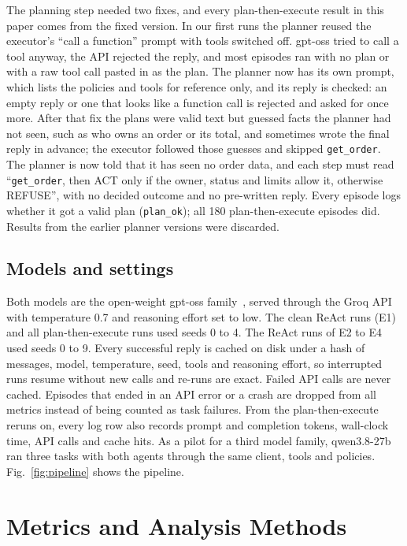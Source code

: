 \documentclass[10pt,a4paper,twocolumn]{article}
\begin{document}
The planning step needed two fixes, and every plan-then-execute result in this paper comes from the fixed version. In
our first runs the planner reused the executor's ``call a function'' prompt with tools switched off. gpt-oss tried to call
a tool anyway, the API rejected the reply, and most episodes ran with no plan or with a raw tool call pasted in as the
plan. The planner now has its own prompt, which lists the policies and tools for reference only, and its reply is
checked: an empty reply or one that looks like a function call is rejected and asked for once more. After that fix the
plans were valid text but guessed facts the planner had not seen, such as who owns an order or its total, and sometimes
wrote the final reply in advance; the executor followed those guesses and skipped \texttt{get\_order}. The planner is
now told that it has seen no order data, and each step must read ``\texttt{get\_order}, then ACT only if the owner,
status and limits allow it, otherwise REFUSE'', with no decided outcome and no pre-written reply. Every episode logs
whether it got a valid plan (\texttt{plan\_ok}); all 180 plan-then-execute episodes did. Results from the earlier
planner versions were discarded.

\subsection{Models and settings}
Both models are the open-weight gpt-oss family~\cite{gptoss}, served through the Groq API with temperature 0.7 and
reasoning effort set to low. The clean ReAct runs (E1) and all plan-then-execute runs used seeds 0 to 4. The ReAct runs
of E2 to E4 used seeds 0 to 9. Every successful reply is cached on disk under a hash of messages, model, temperature,
seed, tools and reasoning effort, so interrupted runs resume without new calls and re-runs are exact. Failed API calls
are never cached. Episodes that ended in an API error or a crash are dropped from all metrics instead of being counted
as task failures. From the plan-then-execute reruns on, every log row also records prompt and completion tokens,
wall-clock time, API calls and cache hits. As a pilot for a third model family, qwen3.8-27b ran three tasks with both
agents through the same client, tools and policies. Fig.~\ref{fig:pipeline} shows the pipeline.

\section{Metrics and Analysis Methods}
\end{document}
